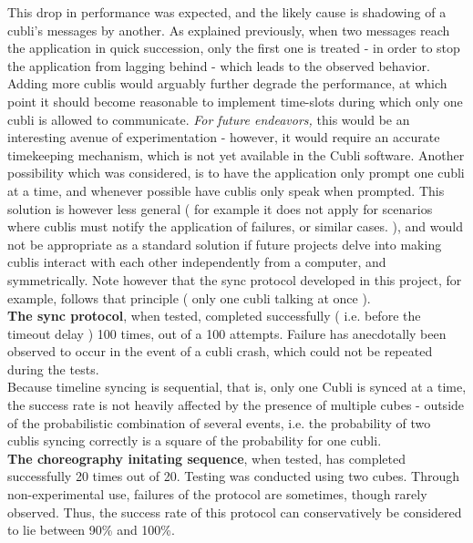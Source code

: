 This drop in performance was expected, and the likely cause is shadowing of a cubli's messages by another. As explained previously, when two messages reach the application in quick succession, only the first one is treated - in order to stop the application from lagging behind - which leads to the observed behavior. \\

Adding more cublis would arguably further degrade the performance, at which point it should become reasonable to implement time-slots during which only one cubli is allowed to communicate. \textit{ For future endeavors, } this would be an interesting avenue of experimentation - however, it would require an accurate timekeeping mechanism, which is not yet available in the Cubli software. Another possibility which was considered, is to have the application only prompt one cubli at a time, and whenever possible have cublis only speak when prompted. This solution is however less general ( for example it does not apply for scenarios where cublis must notify the application of failures, or similar cases. ), and would not be appropriate as a standard solution if future projects delve into making cublis interact with each other independently from a computer, and symmetrically. Note however that the sync protocol developed in this project, for example, follows that principle ( only one cubli talking at once ). \\

\textbf{The sync protocol}, when tested, completed successfully ( i.e. before the timeout delay ) 100 times, out of a 100 attempts. Failure has anecdotally been observed to occur in the event of a cubli crash, which could not be repeated during the tests.\\

Because timeline syncing is sequential, that is, only one Cubli is synced at a time, the success rate is not heavily affected by the presence of multiple cubes - outside of the probabilistic combination of several events, i.e. the probability of two cublis syncing correctly is a square of the probability for one cubli.\\

\textbf{The choreography initating sequence}, when tested, has completed successfully 20 times out of 20. Testing was conducted using two cubes. Through non-experimental use, failures of the protocol are sometimes, though rarely observed. Thus, the success rate of this protocol can conservatively be considered to lie between 90\% and 100\%. 

